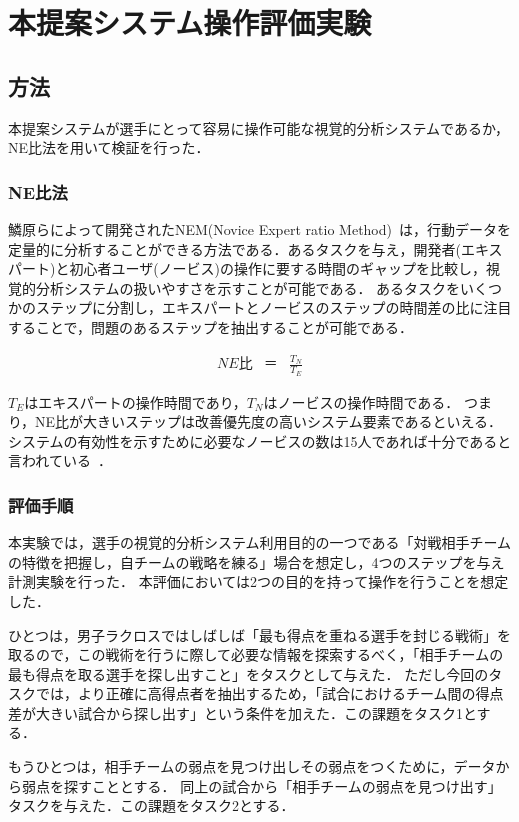 \documentclass[sotsuron]{kuee}
\begin{document}
	\section{本提案システム操作評価実験}
		\subsection{方法}
			本提案システムが選手にとって容易に操作可能な視覚的分析システムであるか，NE比法を用いて検証を行った．
				\subsubsection{NE比法}
					鱗原らによって開発されたNEM(Novice Expert ratio Method)~\cite{NEM}は，行動データを定量的に分析することができる方法である．あるタスクを与え，開発者(エキスパート)と初心者ユーザ(ノービス)の操作に要する時間のギャップを比較し，視覚的分析システムの扱いやすさを示すことが可能である．
					あるタスクをいくつかのステップに分割し，エキスパートとノービスのステップの時間差の比に注目することで，問題のあるステップを抽出することが可能である．

					\begin{eqnarray}
						NE比 & ＝ & \frac{T_N}{T_E}
					\end{eqnarray}
					
					$T_E$はエキスパートの操作時間であり，$T_N$はノービスの操作時間である．
					つまり，NE比が大きいステップは改善優先度の高いシステム要素であるといえる．
					システムの有効性を示すために必要なノービスの数は15人であれば十分であると言われている~\cite{Nielsen}．
				\subsubsection{評価手順}
					本実験では，選手の視覚的分析システム利用目的の一つである「対戦相手チームの特徴を把握し，自チームの戦略を練る」場合を想定し，4つのステップを与え計測実験を行った．
					本評価においては2つの目的を持って操作を行うことを想定した．
					
					ひとつは，男子ラクロスではしばしば「最も得点を重ねる選手を封じる戦術」を取るので，この戦術を行うに際して必要な情報を探索するべく，「相手チームの最も得点を取る選手を探し出すこと」をタスクとして与えた．
					ただし今回のタスクでは，より正確に高得点者を抽出するため，「試合におけるチーム間の得点差が大きい試合から探し出す」という条件を加えた．この課題をタスク1とする．
					
					もうひとつは，相手チームの弱点を見つけ出しその弱点をつくために，データから弱点を探すこととする．
					同上の試合から「相手チームの弱点を見つけ出す」タスクを与えた．この課題をタスク2とする．
					
\end{document}
